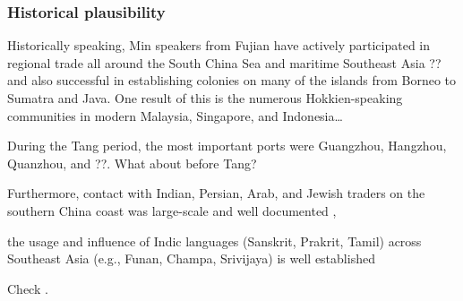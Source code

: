 \documentclass[12pt]{article}
\begin{document}
\subsubsection{Historical plausibility}

Historically speaking, Min speakers from Fujian have actively participated in regional trade all around the South China Sea and maritime Southeast Asia ?? and also successful in establishing colonies on many of the islands from Borneo to Sumatra and Java. One result of this is the numerous Hokkien-speaking communities in modern Malaysia, Singapore, and Indonesia\dots

During the Tang period, the most important ports were Guangzhou, Hangzhou, Quanzhou, and ??. What about before Tang?

Furthermore, contact with Indian, Persian, Arab, and Jewish traders on the southern China coast was large-scale and well documented \parencite[cf.][]{hourani_1975_arab}, 

the usage and influence of Indic languages (Sanskrit, Prakrit, Tamil) across Southeast Asia (e.g., Funan, Champa, Srivijaya) is well established \parencites{wolters_1967_early,coedes_1975_indianized}

Check \parencite{haw_2017_maritime}.




\end{document}
